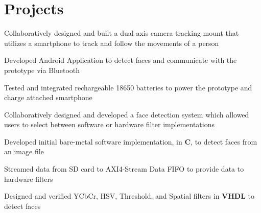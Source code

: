 \documentclass[letterpaper]{deedy-resume} %
\begin{document}
\begin{minipage}[t]{0.66\textwidth}
\sectionspace %


\section{Projects}


\begin{tightitemize}
\item Collaboratively designed and built a dual axis camera tracking mount that utilizes a smartphone to track and follow the movements of a person
\item Developed Android Application to detect faces and communicate with the prototype via Bluetooth
\item Tested and integrated rechargeable 18650 batteries to power the prototype and charge attached smartphone
\end{tightitemize}

\sectionspace %



\begin{tightitemize}
\item Collaboratively designed and developed a face detection system which allowed users to select between software or hardware filter implementations
\item Developed initial bare-metal software implementation, in \textbf{C}, to detect faces from an image file
\item Streamed data from SD card to AXI4-Stream Data FIFO to provide data to hardware filters
\item Designed and verified YCbCr, HSV, Threshold, and Spatial filters in \textbf{VHDL} to detect faces
\end{tightitemize}

\sectionspace %




\end{minipage}
\end{document}
